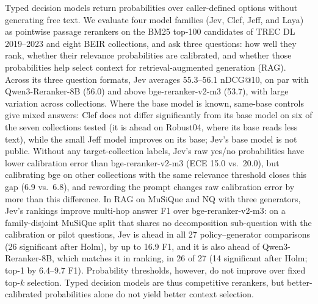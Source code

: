 Typed decision models return probabilities over caller-defined options without generating free text.
We evaluate four model families (Jev, Clef, Jeff, and Laya) as pointwise passage rerankers on the BM25 top-100 candidates of TREC DL 2019--2023 and eight BEIR collections, and ask three questions: how well they rank, whether their relevance probabilities are calibrated, and whether those probabilities help select context for retrieval-augmented generation (RAG).
Across its three question formats, Jev averages 55.3--56.1 nDCG@10, on par with Qwen3-Reranker-8B (56.0) and above bge-reranker-v2-m3 (53.7), with large variation across collections.
Where the base model is known, same-base controls give mixed answers: Clef does not differ significantly from its base model on six of the seven collections tested (it is ahead on Robust04, where its base reads less text), while the small Jeff model improves on its base; Jev's base model is not public.
Without any target-collection labels, Jev's raw yes/no probabilities have lower calibration error than bge-reranker-v2-m3 (ECE 15.0 vs.\ 20.0), but calibrating bge on other collections with the same relevance threshold closes this gap (6.9 vs.\ 6.8), and rewording the prompt changes raw calibration error by more than this difference.
In RAG on MuSiQue and NQ with three generators, Jev's rankings improve multi-hop answer F1 over bge-reranker-v2-m3: on a family-disjoint MuSiQue split that shares no decomposition sub-question with the calibration or pilot questions, Jev is ahead in all 27 policy--generator comparisons (26 significant after Holm), by up to 16.9 F1, and it is also ahead of Qwen3-Reranker-8B, which matches it in ranking, in 26 of 27 (14 significant after Holm; top-1 by 6.4--9.7 F1).
Probability thresholds, however, do not improve over fixed top-$k$ selection.
Typed decision models are thus competitive rerankers, but better-calibrated probabilities alone do not yield better context selection.
